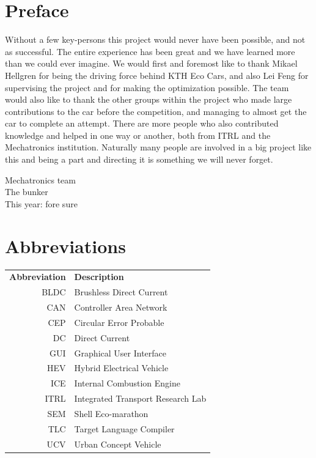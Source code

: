 \documentclass[a4paper, 12pt]{report}
\begin{document}
\chapter*{Preface}
Without a few key-persons this project would never have been possible, and not
as successful. The entire experience has been great and we have learned more
than we could ever imagine.  We would first and foremost like to thank Mikael Hellgren for
being the driving force behind KTH Eco Cars, and also Lei Feng for supervising the
project and for making the optimization possible.  The team would also like to
thank the other groups within the project who made large contributions to the car before the
competition, and managing to almost get the car to complete an attempt.  There
are more people who also contributed knowledge and helped in one way or another,
both from ITRL and the Mechatronics institution.  Naturally many people are
involved in a big project like this and being a part and directing it is
something we will never forget.

\begin{flushright}Mechatronics team \\ The bunker \\This year: fore sure \end{flushright}

\clearpage
\setcounter{tocdepth}{1}
\tableofcontents

\chapter*{Abbreviations}
\noindent{}\begin{tabular}{r  l}
\textbf{Abbreviation} 	& \textbf{Description} \vspace{.5em} \\
BLDC	&Brushless Direct Current\\
CAN	&Controller Area Network\\
CEP     &Circular Error Probable\\
DC	&Direct Current\\
GUI     &Graphical User Interface\\
HEV     &Hybrid Electrical Vehicle\\
ICE 	&Internal Combustion Engine\\
ITRL    &Integrated Transport Research Lab\\
SEM	&Shell Eco-marathon\\
TLC	&Target Language Compiler\\
UCV     &Urban Concept Vehicle

\end{tabular}
\end{document}
